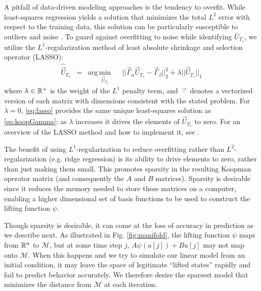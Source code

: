 A pitfall of data-driven modeling approaches is the tendency to overfit.
While least-squares regression yields a solution that minimizes the total $L^2$ error with respect to the training data, this solution can be particularly susceptible to outliers and noise \cite{rousseeuw2005robust}.
To guard against overfitting to noise while identifying $\bar{U}_{T_s}$, we utilize the $L^1$-regularization method of least absolute shrinkage and selection operator (LASSO):
\begin{equation}
\begin{aligned}
\hat{\vec{U}}_{T_s} &= 
& \text{arg}~\underset{ \vec{U}_{T_s} }{\text{min}}
& & || \vec{\Gamma}_\alpha \vec{U}_{T_s} - \vec{\Gamma}_\beta ||_2^2 + \lambda || \vec{U}_{T_s} ||_1
\label{eq:lasso}
\end{aligned}
\end{equation}
where $\lambda \in \mathbb{R}^{+}$ is the weight of the $L^1$ penalty term, and $\vec{\cdot}$ denotes a vectorized version of each matrix with dimensions consistent with the stated problem.
For $\lambda = 0$, \eqref{eq:lasso} provides the same unique least-squares solution as \eqref{eq:koopGamma}; as $\lambda$ increases it drives the elements of $\vec{U}_{T_s}$ to zero.
For an overview of the LASSO method and how to implement it, see \citet{tibshirani1996regression}.

The benefit of using $L^1$-regularization to reduce overfitting rather than $L^2$-regularization (e.g. ridge regression) is its ability to drive elements to zero, rather than just making them small.
This promotes sparsity in the resulting Koopman operator matrix (and consequently the $A$ and $B$ matrices).
Sparsity is desirable since it reduces the memory needed to store these matrices on a computer, enabling a higher dimensional set of basis functions to be used to construct the lifting function $\psi$.

Though sparsity is desirable, it can come at the loss of accuracy in prediction as we describe next. 
As illustrated in Fig. \ref{fig:manifold}, the lifting function $\psi$ maps from $\mathbb{R}^n$ to $\mathcal{M}$, but at some time step $j$, $A\psi(a[j]) + B u[j]$ may not map onto $\mathcal{M}$.
When this happens and we try to simulate our linear model from an initial condition, it may leave the space of legitimate ``lifted states'' rapidly and fail to predict behavior accurately.
We therefore desire the sparsest model that minimizes the distance from $\mathcal{M}$ at each iteration.


